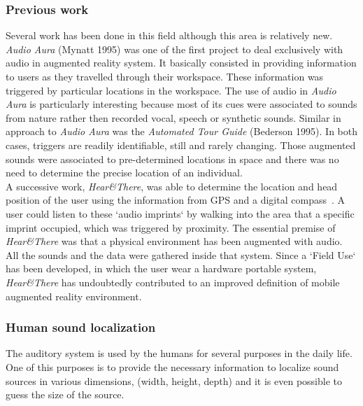 \documentclass[journal]{IEEEtran}
\begin{document}
\subsubsection{Previous work}
Several work has been done in this field although this area is relatively new. \emph{Audio Aura} (Mynatt 1995) was one of the first project to deal exclusively with audio in augmented reality system. It basically consisted in providing information to users as they travelled through their workspace. These information was triggered by particular locations in the workspace. The use of audio in \emph{Audio Aura} is particularly interesting because most of its cues were associated to sounds from nature rather then recorded vocal, speech or synthetic sounds. Similar in approach to \emph{Audio Aura} was the \emph{Automated Tour Guide} (Bederson 1995). In both cases, triggers are readily identifiable, still and rarely changing. Those augmented sounds were associated to pre-determined locations in space and there was no need to determine the precise location of an individual. \\
A successive work, \emph{Hear\&There}, was able to determine the location and head position of the user using the information from GPS and a digital compass~\cite{}. A user could listen to these `audio imprints` by walking into the area that a specific imprint occupied, which was triggered by proximity. The essential premise of  \emph{Hear\&There} was that a physical environment has been augmented with audio. All the sounds and the data were gathered inside that system. Since a `Field Use` has been developed, in which the user wear a hardware portable system, \emph{Hear\&There} has undoubtedly contributed to an improved definition of mobile augmented reality environment.

\subsubsection{Human sound localization}
The auditory system is used by the humans for several purposes in the daily life. One of this purposes is to provide the necessary information to localize sound sources in various dimensions, (width, height, depth) and it is even possible to guess the size of the source.\\
\end{document}
